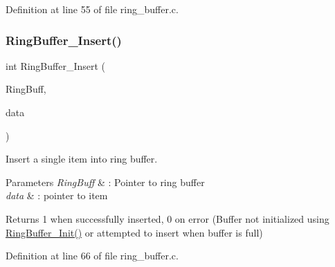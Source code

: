 Definition at line 55 of file ring\+\_\+buffer.\+c.

\mbox{\label{group___ring___buffer_gaafdee54f2525b2c7a983d1a631b42226}} 
\subsubsection{\texorpdfstring{Ring\+Buffer\+\_\+\+Insert()}{RingBuffer\_Insert()}}
{\footnotesize\ttfamily int Ring\+Buffer\+\_\+\+Insert (\begin{DoxyParamCaption}\item[{\hyperlink{struct_r_i_n_g_b_u_f_f___t}{R\+I\+N\+G\+B\+U\+F\+F\+\_\+T} $\ast$}]{Ring\+Buff,  }\item[{const void $\ast$}]{data }\end{DoxyParamCaption})}



Insert a single item into ring buffer. 


\begin{DoxyParams}{Parameters}
{\em Ring\+Buff} & \+: Pointer to ring buffer \\
\hline
{\em data} & \+: pointer to item \\
\hline
\end{DoxyParams}
\begin{DoxyReturn}{Returns}
1 when successfully inserted, 0 on error (Buffer not initialized using \hyperlink{group___ring___buffer_gaaf3bb51f2228ea1bea603e19c7eba5bb}{Ring\+Buffer\+\_\+\+Init()} or attempted to insert when buffer is full) 
\end{DoxyReturn}


Definition at line 66 of file ring\+\_\+buffer.\+c.

\mbox{\label{group___ring___buffer_gafeafb521d4e03052ab2c893fd0e388d5}} 
